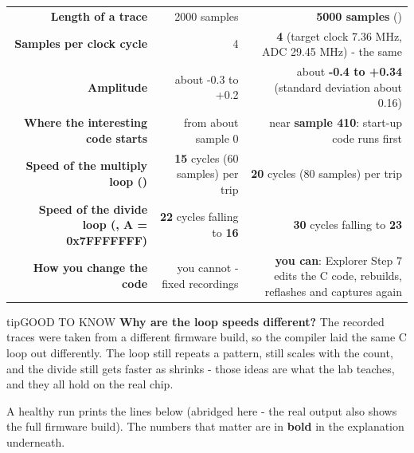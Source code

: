 \documentclass[11pt,letterpaper]{article}
\begin{document}
{\small{}
\begin{longtable}{|R{0.3333}|R{0.3043}|R{0.3623}|}
\hline
{}\hdrcell{} &  &  \\ \hline
\endhead
\textbf{Length of a trace} & 2000 samples & \textbf{5000 samples} () \\ \hline
\textbf{Samples per clock cycle} & 4 & \textbf{4} (target clock 7.36 MHz, ADC 29.45 MHz) - the same \\ \hline
\textbf{Amplitude} & about -0.3 to +0.2 & about \textbf{-0.4 to +0.34} (standard deviation about 0.16) \\ \hline
\textbf{Where the interesting code starts} & from about sample 0 & near \textbf{sample 410}: start-up code runs first \\ \hline
\textbf{Speed of the multiply loop ()} & \textbf{15} cycles (60 samples) per trip & \textbf{20} cycles (80 samples) per trip \\ \hline
\textbf{Speed of the divide loop (, A = 0x7FFFFFFF)} & \textbf{22} cycles falling to \textbf{16} & \textbf{30} cycles falling to \textbf{23} \\ \hline
\textbf{How you change the code} & you cannot - fixed recordings & \textbf{you can}: Explorer Step 7 edits the C code, rebuilds, reflashes and captures again \\ \hline
\end{longtable}}

\vspace{4pt}

\begin{guidecallout}{tip}{GOOD TO KNOW}
\textbf{Why are the loop speeds different?} The recorded traces were taken from a different firmware build, so the
compiler laid the same C loop out differently. The loop still repeats a pattern, still scales with the count, and the
divide still gets faster as  shrinks - those ideas are what the lab teaches, and they all hold on the real
chip.
\end{guidecallout}

\Needspace{259pt}


A healthy run prints the lines below (abridged here - the real output also shows the full firmware build). The numbers
that matter are in \textbf{bold} in the explanation underneath.
\end{document}
